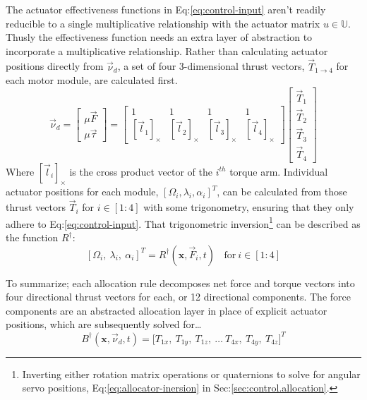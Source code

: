 \par
The actuator effectiveness functions in Eq:\ref{eq:control-input} aren't readily reducible to a single multiplicative relationship with the actuator matrix $u\in\mathbb{U}$. Thusly the effectiveness function needs an extra layer of abstraction to incorporate a multiplicative relationship. Rather than calculating actuator positions directly from $\vec{\nu}_d$, a set of four 3-dimensional thrust vectors, $\vec{T}_{1\rightarrow 4}$ for each motor module, are calculated first.
\begin{equation}\label{eq:4.7}
\vec{\nu}_d=\begin{bmatrix}
\mu\vec{F}\\
\mu\vec{\tau}
\end{bmatrix}
= 
\begin{bmatrix}
1 & 1 & 1 & 1\\
[\vec{l}_1]_\times & [\vec{l}_2]_\times & [\vec{l}_3]_\times & [\vec{l}_4]_\times
\end{bmatrix}
\begin{bmatrix}
\vec{T}_1\\
\vec{T}_2\\
\vec{T}_3\\
\vec{T}_4
\end{bmatrix}
\end{equation}
Where $[\vec{l}_i]_\times$ is the cross product vector of the $i^{th}$ torque arm. Individual actuator positions for each module, $[\Omega_i,\lambda_i,\alpha_i]^T$, can be calculated from those thrust vectors $\vec{T}_i$ for $i\in[1:4]$ with some trigonometry, ensuring that they only adhere to Eq:\ref{eq:control-input}. That trigonometric inversion\footnote{Inverting either rotation matrix operations or quaternions to solve for angular servo positions, Eq:\ref{eq:allocator-inersion} in Sec:\ref{sec:control.allocation}.} can be described as the function $R^\dagger$:
\begin{equation}\label{eq:4.8}
[\Omega_i,~\lambda_i,~\alpha_i]^T=R^\dagger(\mathbf{x},\vec{F}_i,t)~~~~\text{for}~i\in[1:4]
\end{equation}
\par
To summarize; each allocation rule decomposes net force and torque vectors into four directional thrust vectors for each, or 12 directional components. The force components are an abstracted allocation layer in place of explicit actuator positions, which are subsequently solved for\ldots
\begin{equation}
B^{\dagger}(\mathbf{x},\vec{\nu}_d,t)=\big[ T_{1x},~T_{1y},~T_{1z},~\ldots~T_{4x},~T_{4y},~T_{4z}\big]^T
\end{equation}
